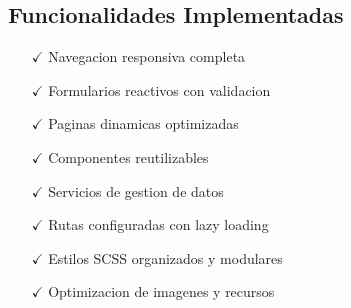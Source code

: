 \subsection{Funcionalidades Implementadas}

\begin{itemize}
    \item[$\checkmark$] Navegacion responsiva completa
    \item[$\checkmark$] Formularios reactivos con validacion
    \item[$\checkmark$] Paginas dinamicas optimizadas  
    \item[$\checkmark$] Componentes reutilizables
    \item[$\checkmark$] Servicios de gestion de datos
    \item[$\checkmark$] Rutas configuradas con lazy loading
    \item[$\checkmark$] Estilos SCSS organizados y modulares
    \item[$\checkmark$] Optimizacion de imagenes y recursos
\end{itemize}
